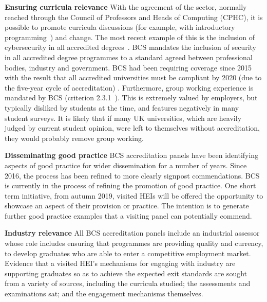 \documentclass[sigconf]{acmart}
\begin{document}
{\textbf{Ensuring curricula relevance}} With the agreement of the
sector, normally reached through the Council of Professors and Heads
of Computing (CPHC), it is possible to promote curricula
discussions (for example, with introductory
programming~\cite{murphy-et-al:programming2017}) and change. The most recent
example of this is the inclusion of cybersecurity in all accredited
degrees~\cite{Cricketal2019}. BCS mandates the inclusion of security
in all accredited degree programmes to a standard agreed between
professional bodies, industry and government. BCS had been requiring
coverage since 2015 \cite[p.~17--18]{BCS2018a} with the result that
all accredited universities must be compliant by 2020 (due to the
five-year cycle of accreditation) \cite{Cricketal2019}. Furthermore,
group working experience is mandated by BCS (criterion 2.3.1~\cite
[p31] {BCS2018a}). This is extremely valued by employers, but
typically disliked by students at the time, and features negatively in
many student surveys. It is likely that if many UK universities, which
are heavily judged by current student opinion, were left to themselves
without accreditation, they would probably remove group working.


{\textbf{Disseminating good practice}} BCS accreditation panels have
been identifying aspects of good practice for wider dissemination for
a number of years. Since 2016, the process has been refined to more
clearly signpost commendations. BCS is currently in the process of
refining the promotion of good practice. One short term initiative,
from autumn 2019, visited HEIs will be offered the opportunity to
showcase an aspect of their provision or practice. The intention is to
generate further good practice examples that a visiting panel can
potentially commend.

{\textbf{Industry relevance}} All BCS accreditation panels include an
industrial assessor whose role includes ensuring that programmes are
providing quality and currency, to develop graduates who are able to
enter a competitive employment market. Evidence that a visited HEI's
mechanisms for engaging with industry are supporting graduates so as
to achieve the expected exit standards are sought from a variety of
sources, including the curricula studied; the assessments and
examinations sat; and the engagement mechanisms themselves.
\end{document}
